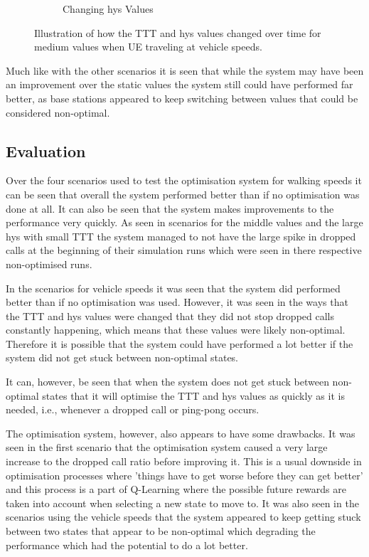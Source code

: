 \begin{figure}[H]
\begin{subfigure}[b]{0.49\textwidth}
                \caption{Changing hys Values}
                \label{fig:veh_highhys_hys}
        \end{subfigure}
        \caption{Illustration of how the TTT and hys values changed over time for medium values when UE traveling at vehicle speeds.}\label{fig:veh_highhys_ttthys}
\end{figure}
Much like with the other scenarios it is seen that while the system may have been an improvement over the static values the system still could have performed far better, as base stations appeared to keep switching between values that could be considered non-optimal.
\subsection{Evaluation}
Over the four scenarios used to test the optimisation system for walking speeds it can be seen that overall the system performed better than if no optimisation was done at all. It can also be seen that the system makes improvements to the performance very quickly. As seen in scenarios for the middle values and the large hys with small TTT the system managed to not have the large spike in dropped calls at the beginning of their simulation runs which were seen in there respective non-optimised runs.

In the scenarios for vehicle speeds it was seen that the system did performed better than if no optimisation was used. However, it was seen in the ways that the TTT and hys values were changed that they did not stop dropped calls constantly happening, which means that these values were likely non-optimal. Therefore it is possible that the system could have performed a lot better if the system did not get stuck between non-optimal states.

It can, however, be seen that when the system does not get stuck between non-optimal states that it will optimise the TTT and hys values as quickly as it is needed, i.e., whenever a dropped call or ping-pong occurs.

The optimisation system, however, also appears to have some drawbacks. It was seen in the first scenario that the optimisation system caused a very large increase to the dropped call ratio before improving it. This is a usual downside in optimisation processes where 'things have to get worse before they can get better' and this process is a part of Q-Learning where the possible future rewards are taken into account when selecting a new state to move to. It was also seen in the scenarios using the vehicle speeds that the system appeared to keep getting stuck between two states that appear to be non-optimal which degrading the performance which had the potential to do a lot better.